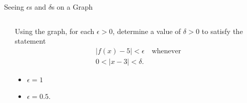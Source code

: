 \documentclass[Cal1Spr16Lectures.tex]{subfiles}
\begin{document}
\begin{frame}{\small Seeing $\epsilon$s and $\delta$s on a Graph}\footnotesize
\begin{ex}
\begin{columns}[T]
	\begin{column}{.36\textwidth}
	\end{column}
	\begin{column}{.5\textwidth}
		Using the graph, for each $\epsilon >0$, determine a value of $\delta>0$ to satisfy the statement 
		\begin{multline*}|f(x)-5|<\epsilon\quad\text{whenever} \\
			0<|x-3|<\delta.\end{multline*}  
		\vspace{-1.5pc}
		\begin{itemize}
		\item[(a) ] $\epsilon=1$ 
		\item[(b) ] $\epsilon=0.5$.
		\end{itemize}
	\end{column}
\end{columns}
\end{ex}
\end{frame} 
\end{document}
